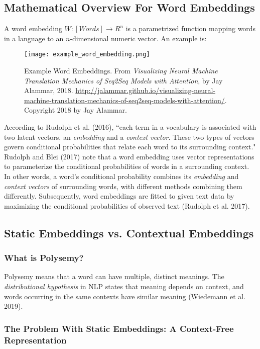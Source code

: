 \subsection{Mathematical Overview For Word Embeddings}
 
A word embedding $W: [Words] \rightarrow R^n$ is a parametrized function mapping words in a language to an $n$-dimensional numeric vector. An example is: 

\begin{figure}[h]
\centering
\texttt{[image: example\_word\_embedding.png]}
\caption{Example Word Embeddings. From \emph{Visualizing Neural Machine Translation Mechanics of Seq2Seq Models with Attention}, by Jay Alammar, 2018. \url{http://jalammar.github.io/visualizing-neural-machine-translation-mechanics-of-seq2seq-models-with-attention/}. Copyright 2018 by Jay Alammar.}
\end{figure}

According to Rudolph et al. (2016), ``each term in a vocabulary is associated with two latent vectors, an \emph{embedding} and a \emph{context vector}. These two types of vectors govern conditional probabilities that relate each word to its surrounding context." 
Rudolph and Blei (2017) note that a word embedding uses vector representations to parameterize the conditional probabilities of words in a surrounding context. 
In other words, a word's conditional probability combines its \emph{embedding} and \emph{context vectors} of surrounding words, with different methods combining them differently. Subsequently, word embeddings are fitted to given text data by maximizing the conditional probabilities of observed text (Rudolph et al. 2017). 

\subsection{Static Embeddings vs. Contextual Embeddings}

\subsubsection{What is Polysemy?}

Polysemy means that a word can have multiple, distinct meanings. The \emph{distributional hypothesis} in NLP states that meaning depends on context, and words occurring in the same contexts have similar meaning (Wiedemann et al. 2019). 

\subsubsection{The Problem With Static Embeddings: A Context-Free Representation}

